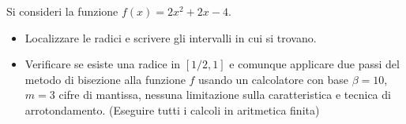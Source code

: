 Si consideri la funzione $f(x)=2x^2+2x-4$.
\begin{itemize}
\item  Localizzare le radici e
scrivere gli intervalli in cui si trovano.
\item Verificare se esiste una radice in $[1/2, 1]$ e comunque applicare due passi del
metodo di bisezione alla funzione $f$ usando un calcolatore con
base $\beta =10$, $m=3$ cifre di mantissa, nessuna limitazione
sulla caratteristica e tecnica di arrotondamento. (Eseguire tutti
i calcoli in aritmetica finita)
\end{itemize}
